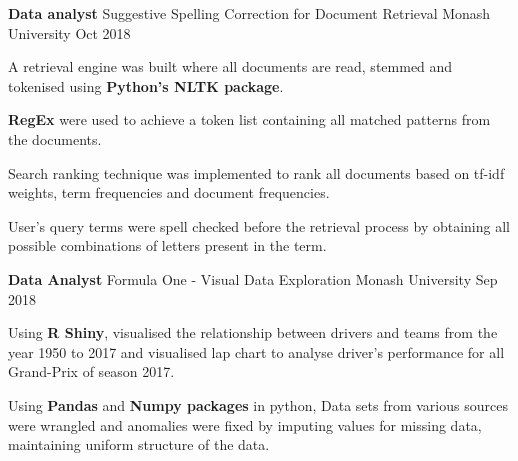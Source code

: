 \begin{cventries}
  \cventry
    {\textbf{Data analyst}} %
    {Suggestive Spelling Correction for Document Retrieval } %
    {Monash University} %
    {Oct 2018} %
    {
      \begin{cvitems} %
        \normalsize{\item {A retrieval engine was built where all documents are read, stemmed and tokenised using \textbf{Python's NLTK package}.} 
        \item{\textbf{RegEx} were used to achieve a token list containing all matched patterns from the documents.}
        \item{Search ranking technique was implemented to rank all documents based on tf-idf weights, term frequencies and document frequencies.}
        \item{User’s query terms were spell checked before the retrieval process by obtaining all possible combinations of letters present in the term.}}
      \end{cvitems}
    }
\vspace{0.3cm}    
\cventry
    {\textbf{Data Analyst}} %
    {Formula One - Visual Data Exploration } %
    {Monash University} %
    {Sep 2018} %
    {
      \begin{cvitems} %
        \normalsize{\item{Using \textbf{R Shiny}, visualised the relationship between drivers and teams from the year 1950 to 2017 and visualised lap chart to analyse driver's performance for all Grand-Prix of season 2017.}
        \item{Using \textbf{Pandas} and \textbf{Numpy packages} in python, Data sets from various sources were wrangled and anomalies were fixed by imputing values for missing data, maintaining uniform structure of the data.}}
      \end{cvitems}
    }



\end{cventries}
